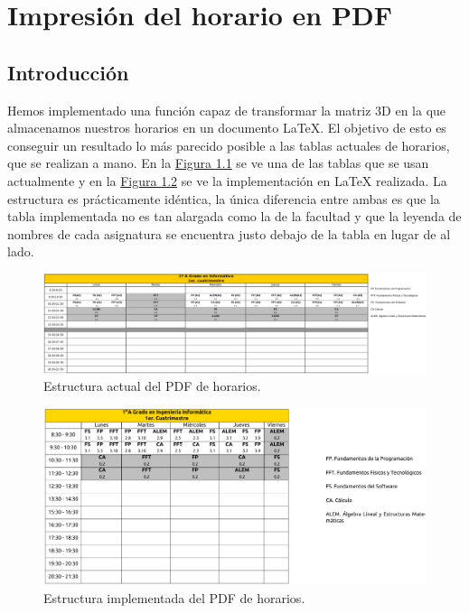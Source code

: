 \chapter{Impresión del horario en PDF}

\section{Introducción}
Hemos implementado una función capaz de transformar la matriz 3D en la que almacenamos nuestros horarios en un documento \LaTeX. El objetivo de esto es conseguir un resultado lo más parecido posible a las tablas actuales de horarios, que se realizan a mano. En la \hyperref[horario_actual]{Figura \ref*{horario_actual}} se ve una de las tablas que se usan actualmente y en la \hyperref[horario_implementado]{Figura \ref*{horario_implementado}} se ve la implementación en \LaTeX\; realizada. La estructura es prácticamente idéntica, la única diferencia entre ambas es que la tabla implementada no es tan alargada como la de la facultad y que la leyenda de nombres de cada asignatura se encuentra justo debajo de la tabla en lugar de al lado.

\begin{figure}[H]
    \centering
    \includegraphics[width=\textwidth]{img/horario_actual}
    \caption{Estructura actual del PDF de horarios.}
    \label{horario_actual}
\end{figure}

\begin{figure}[H]
    \centering
    \includegraphics[width=\textwidth]{img/horario_implementado}
    \caption{Estructura implementada del PDF de horarios.}
    \label{horario_implementado}
\end{figure}

